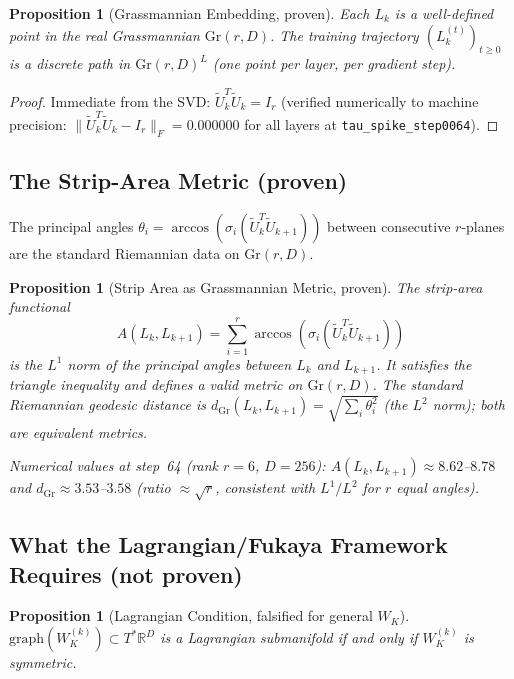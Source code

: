 \documentclass[11pt]{amsart}
\newtheorem{proposition}[theorem]{Proposition}
\begin{document}
\begin{proposition}[Grassmannian Embedding, proven]
\label{prop:grassmannian}
Each $L_k$ is a well-defined point in the real Grassmannian $\mathrm{Gr}(r,D)$.
The training trajectory $(L_k^{(t)})_{t \geq 0}$ is a discrete path in
$\mathrm{Gr}(r,D)^L$ (one point per layer, per gradient step).
\end{proposition}

\begin{proof}
Immediate from the SVD: $\tilde{U}_k^T \tilde{U}_k = I_r$ (verified numerically
to machine precision: $\|\tilde{U}_k^T\tilde{U}_k - I_r\|_F = 0.000000$
for all layers at \texttt{tau\_spike\_step0064}).
\end{proof}

\subsection{The Strip-Area Metric (proven)}

The principal angles $\theta_i = \arccos(\sigma_i(\tilde{U}_k^T\tilde{U}_{k+1}))$
between consecutive $r$-planes are the standard Riemannian data on $\mathrm{Gr}(r,D)$.

\begin{proposition}[Strip Area as Grassmannian Metric, proven]
\label{prop:strip_metric}
The strip-area functional
\[
  A(L_k, L_{k+1}) = \sum_{i=1}^r \arccos(\sigma_i(\tilde{U}_k^T\tilde{U}_{k+1}))
\]
is the $L^1$ norm of the principal angles between $L_k$ and $L_{k+1}$.
It satisfies the triangle inequality and defines a valid metric on $\mathrm{Gr}(r,D)$.
The standard Riemannian geodesic distance is
$d_{\mathrm{Gr}}(L_k, L_{k+1}) = \sqrt{\sum_i \theta_i^2}$ (the $L^2$ norm);
both are equivalent metrics.

\emph{Numerical values at step~64} (rank $r=6$, $D=256$):
$A(L_k, L_{k+1}) \approx 8.62$--$8.78$ and $d_{\mathrm{Gr}} \approx 3.53$--$3.58$
(ratio $\approx \sqrt{r}$, consistent with $L^1/L^2$ for $r$ equal angles).
\end{proposition}

\subsection{What the Lagrangian/Fukaya Framework Requires (not proven)}

\begin{proposition}[Lagrangian Condition, falsified for general $W_K$]
\label{prop:lagrangian}
$\mathrm{graph}(W_K^{(k)}) \subset T^*\mathbb{R}^D$ is a Lagrangian submanifold
if and only if $W_K^{(k)}$ is symmetric.
\end{proposition}
\end{document}
